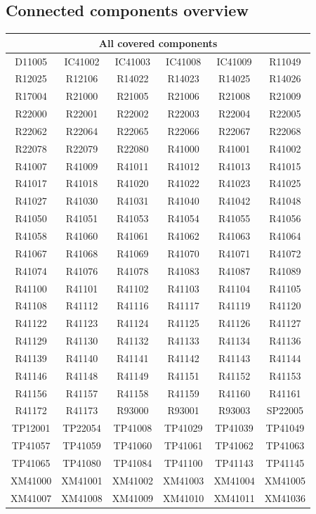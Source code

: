\subsection{Connected components overview}
 \begin{center} 
  \begin{longtable}{|c|c|c|c|c|c|} 
   \hline 
    \multicolumn{6}{|c|}{All covered components}\\ 
   \hline 
    D11005 & IC41002 & IC41003 & IC41008 & IC41009 & R11049 \\ \hline 
    R12025 & R12106 & R14022 & R14023 & R14025 & R14026 \\ \hline 
    R17004 & R21000 & R21005 & R21006 & R21008 & R21009 \\ \hline 
    R22000 & R22001 & R22002 & R22003 & R22004 & R22005 \\ \hline 
    R22062 & R22064 & R22065 & R22066 & R22067 & R22068 \\ \hline 
    R22078 & R22079 & R22080 & R41000 & R41001 & R41002 \\ \hline 
    R41007 & R41009 & R41011 & R41012 & R41013 & R41015 \\ \hline 
    R41017 & R41018 & R41020 & R41022 & R41023 & R41025 \\ \hline 
    R41027 & R41030 & R41031 & R41040 & R41042 & R41048 \\ \hline 
    R41050 & R41051 & R41053 & R41054 & R41055 & R41056 \\ \hline 
    R41058 & R41060 & R41061 & R41062 & R41063 & R41064 \\ \hline 
    R41067 & R41068 & R41069 & R41070 & R41071 & R41072 \\ \hline 
    R41074 & R41076 & R41078 & R41083 & R41087 & R41089 \\ \hline 
    R41100 & R41101 & R41102 & R41103 & R41104 & R41105 \\ \hline 
    R41108 & R41112 & R41116 & R41117 & R41119 & R41120 \\ \hline 
    R41122 & R41123 & R41124 & R41125 & R41126 & R41127 \\ \hline 
    R41129 & R41130 & R41132 & R41133 & R41134 & R41136 \\ \hline 
    R41139 & R41140 & R41141 & R41142 & R41143 & R41144 \\ \hline 
    R41146 & R41148 & R41149 & R41151 & R41152 & R41153 \\ \hline 
    R41156 & R41157 & R41158 & R41159 & R41160 & R41161 \\ \hline 
    R41172 & R41173 & R93000 & R93001 & R93003 & SP22005 \\ \hline 
    TP12001 & TP22054 & TP41008 & TP41029 & TP41039 & TP41049 \\ \hline 
    TP41057 & TP41059 & TP41060 & TP41061 & TP41062 & TP41063 \\ \hline 
    TP41065 & TP41080 & TP41084 & TP41100 & TP41143 & TP41145 \\ \hline 
    XM41000 & XM41001 & XM41002 & XM41003 & XM41004 & XM41005 \\ \hline 
    XM41007 & XM41008 & XM41009 & XM41010 & XM41011 & XM41036 \\ \hline 
  \end{longtable} 
 \end{center}
